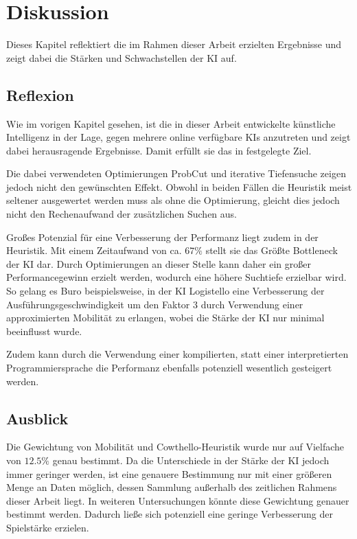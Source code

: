 
\chapter{Diskussion}
\label{chap:diskussion}
Dieses Kapitel reflektiert die im Rahmen dieser Arbeit erzielten Ergebnisse und zeigt dabei die Stärken und
Schwachstellen der KI auf.

\section{Reflexion}
Wie im vorigen Kapitel gesehen, ist die in dieser Arbeit entwickelte künstliche Intelligenz in der Lage, gegen mehrere
online verfügbare KIs anzutreten und zeigt dabei herausragende Ergebnisse. Damit erfüllt sie das in \label{sec:goal}
festgelegte Ziel.

Die dabei verwendeten Optimierungen ProbCut und iterative Tiefensuche zeigen jedoch nicht den gewünschten Effekt.
Obwohl in beiden Fällen die Heuristik meist seltener ausgewertet werden muss als ohne die Optimierung, gleicht dies jedoch
nicht den Rechenaufwand der zusätzlichen Suchen aus.

Großes Potenzial für eine Verbesserung der Performanz liegt zudem in der Heuristik. Mit einem Zeitaufwand von ca.
\(67\%\) stellt sie das Größte Bottleneck der KI dar. Durch Optimierungen an dieser Stelle kann daher ein großer
Performancegewinn erzielt werden, wodurch eine höhere Suchtiefe erzielbar wird. So gelang es Buro beispielsweise, in der
KI Logistello eine Verbesserung der Ausführungsgeschwindigkeit um den Faktor 3 durch Verwendung einer approximierten
Mobilität zu erlangen, wobei die Stärke der KI nur minimal beeinflusst wurde. \cite[S.~8]{evaluationfunctions}

Zudem kann durch die Verwendung einer kompilierten, statt einer interpretierten Programmiersprache die Performanz
ebenfalls potenziell wesentlich gesteigert werden.


\section{Ausblick}
Die Gewichtung von Mobilität und Cowthello-Heuristik wurde nur auf Vielfache von \(12.5\%\) genau bestimmt. Da die
Unterschiede in der Stärke der KI jedoch immer geringer werden, ist eine genauere Bestimmung nur mit einer größeren
Menge an Daten möglich, dessen Sammlung außerhalb des zeitlichen Rahmens dieser Arbeit liegt. In weiteren Untersuchungen
könnte diese Gewichtung genauer bestimmt werden. Dadurch ließe sich potenziell eine geringe Verbesserung der Spielstärke
erzielen.


